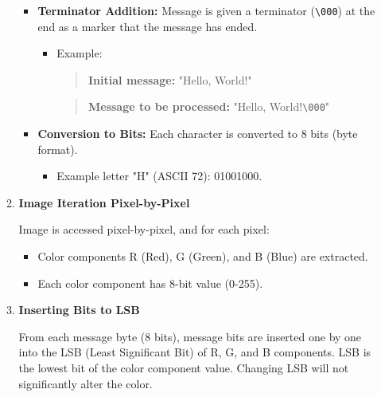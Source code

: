 \documentclass{ittelkom}
\begin{document}
\begin{enumerate}
\begin{enumerate}
\begin{itemize}
                        \item \textbf{Terminator Addition:}
                              Message is given a terminator (\texttt{\textbackslash 000}) at the end as a marker that the message has ended.
                              \begin{itemize}
                                  \item Example:
                                        \begin{quote}
                                            \textbf{Initial message:} "Hello, World!"
                                        \end{quote}
                                        \begin{quote}
                                            \textbf{Message to be processed:} "Hello, World!\texttt{\textbackslash 000}"
                                        \end{quote}
                              \end{itemize}

                        \item \textbf{Conversion to Bits:}
                              Each character is converted to 8 bits (byte format).
                              \begin{itemize}
                                  \item Example letter "H" (ASCII 72): 01001000.
                              \end{itemize}
                    \end{itemize}

              \item \textbf{Image Iteration Pixel-by-Pixel}

                    Image is accessed pixel-by-pixel, and for each pixel:
                    \begin{itemize}
                        \item Color components R (Red), G (Green), and B (Blue) are extracted.
                        \item Each color component has 8-bit value (0-255).
                    \end{itemize}

              \item \textbf{Inserting Bits to LSB}

                    From each message byte (8 bits), message bits are inserted one by one into the
                    LSB (Least Significant Bit) of R, G, and B components. LSB is the lowest bit of
                    the color component value. Changing LSB will not significantly alter the color.


\end{enumerate}
\end{enumerate}
\end{document}
